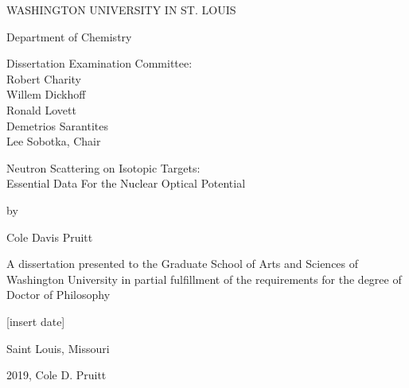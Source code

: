 \begin{titlepage}
\begin{singlespace}
  \begin{center}
        \vspace*{1cm}
        
        WASHINGTON UNIVERSITY IN ST. LOUIS
        
        \vspace{0.5cm}
        Department of Chemistry
        
        \vspace{1.5cm}

        Dissertation Examination Committee:\\
        Robert Charity\\
        Willem Dickhoff\\ 
        Ronald Lovett\\
        Demetrios Sarantites\\
        Lee Sobotka, Chair\\
    
        \vspace{1.5 cm}

        Neutron Scattering on Isotopic Targets:\\
        Essential Data For the Nuclear Optical Potential

        \vspace{0.5 cm}

        by

        \vspace{0.5 cm}
        
        Cole Davis Pruitt
        
        \vfill
        
        A dissertation presented to the Graduate School of Arts and Sciences of Washington University in partial fulfillment of the requirements for the degree of Doctor of Philosophy
        
        \vspace{0.8cm}
        
        [insert date]
        
        \vspace{0.5 cm}
        Saint Louis, Missouri
        
      \end{center}
      \end{singlespace}
    \end{titlepage}
    
    \clearpage
    
    \vspace*{\fill}
    \begin{center}    
      \textcopyright \hspace{2pt} 2019, Cole D. Pruitt
    \end{center}
    \vspace*{\fill}
    
    \thispagestyle{empty} %
    \addtocounter{page}{-1}%
    \clearpage
